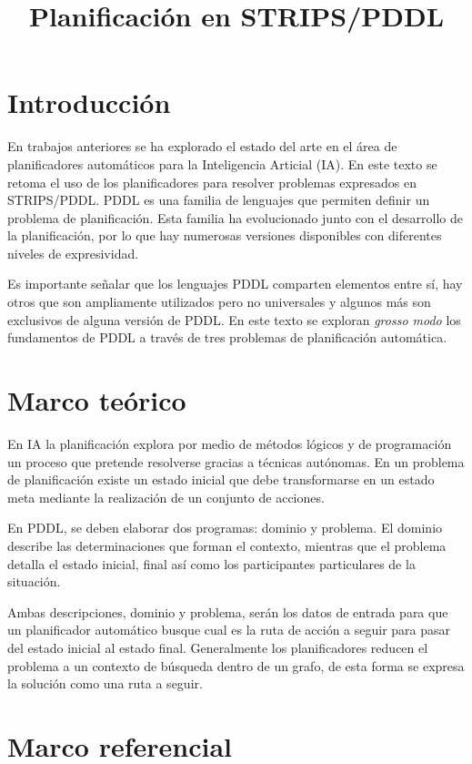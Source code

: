 \documentclass[a4paper,12pt]{article}
\title{Planificación en STRIPS/PDDL}
\makeatletter
\let\newtitle\@title
\makeatother
\begin{document}
\textcolor{UnirDark}{\LARGE\bfseries\newtitle}

\section{Introducción}

En trabajos anteriores se ha explorado el estado del arte en el área de planificadores automáticos para la Inteligencia Articial (IA). En este texto se retoma el uso de los planificadores para resolver problemas expresados en STRIPS/PDDL. PDDL es una familia de lenguajes que permiten definir un problema de planificación. Esta familia ha evolucionado junto con el desarrollo de la planificación, por lo que hay numerosas versiones disponibles con diferentes niveles de expresividad.~\citep{Green_2021a}

Es importante señalar que los lenguajes PDDL comparten elementos entre sí, hay otros que son ampliamente utilizados pero no universales y algunos más son exclusivos de alguna versión de PDDL. En este texto se exploran \textit{grosso modo} los fundamentos de PDDL a través de tres problemas de planificación automática.

\section{Marco teórico}

En IA la planificación explora por medio de métodos lógicos y de programación un proceso que pretende resolverse gracias a técnicas autónomas. En un problema de planificación existe un estado inicial que debe transformarse en un estado meta mediante la realización de un conjunto de acciones.~\citep{Ghallab_Nau_Traverso_2004, Green_2021b}

En PDDL, se deben elaborar dos programas: dominio y problema. El dominio describe las determinaciones que forman el contexto, mientras que el problema detalla el estado inicial, final así como los participantes particulares de la situación.

Ambas descripciones, dominio y problema, serán los datos de entrada para que un planificador automático busque cual es la ruta de acción a seguir para pasar del estado inicial al estado final. Generalmente los planificadores reducen el problema a un contexto de búsqueda dentro de un grafo, de esta forma se expresa la solución como una ruta a seguir.

\section{Marco referencial}
\end{document}
